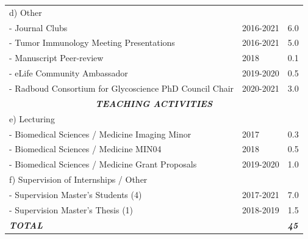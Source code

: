 \begin{table}[h]
{\begin{tabular}{llllll}
\multicolumn{4}{l}{d) Other}                                                                        &           &                      \\
\multicolumn{4}{l}{- Journal Clubs}                                                                 & 2016-2021 & 6.0                  \\
\multicolumn{4}{l}{- Tumor Immunology Meeting Presentations}                                        & 2016-2021 & 5.0                  \\
\multicolumn{4}{l}{- Manuscript Peer-review}                                                        & 2018      & 0.1                  \\
\multicolumn{4}{l}{- eLife Community Ambassador}                                                    & 2019-2020 & 0.5                  \\
\multicolumn{4}{l}{- Radboud Consortium for Glycoscience PhD Council Chair}                         & 2020-2021 & 3.0                  \\ \hline
\multicolumn{6}{c}{\textit{\textbf{TEACHING ACTIVITIES}}}                                                                                                \\ \hline
\multicolumn{4}{l}{e) Lecturing}                                                                    &           &                      \\
\multicolumn{4}{l}{- Biomedical Sciences / Medicine Imaging Minor}                                  & 2017      & 0.3                  \\
\multicolumn{4}{l}{- Biomedical Sciences / Medicine MIN04}                                          & 2018      & 0.5                  \\
\multicolumn{4}{l}{- Biomedical Sciences / Medicine Grant Proposals}                                & 2019-2020 & 1.0                  \\ \hline
\multicolumn{4}{l}{f) Supervision of Internships / Other}                                           &           &                      \\
\multicolumn{4}{l}{- Supervision Master's Students (4)}                                             & 2017-2021 & 7.0                  \\
\multicolumn{4}{l}{- Supervision Master's Thesis (1)}                                               & 2018-2019 & 1.5                  \\
\multicolumn{5}{l}{\textit{\textbf{TOTAL}}}                                                                     & \textit{\textbf{45}}
\end{tabular}%
}
\end{table}

\normalsize